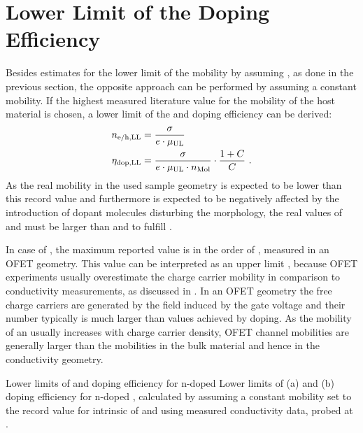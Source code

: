 \section{Lower Limit of the Doping Efficiency}\label{sec:rechDopEffLL}
Besides estimates for the lower limit of the mobility by assuming \DopEff[100], as done in the previous section, the opposite approach can be performed by assuming a constant mobility. If the highest measured literature value for the mobility \mobUL of the host material is chosen, a lower limit of the \nLong \nehLL and doping efficiency \DopEffLL can be derived:
\begin{align}
\nehLL &= \frac{\c}{e\cdot\mobUL} \label{eq:nehLL}\\
\DopEffLL &= \frac{\c}{e \cdot \mobUL \cdot \nM} \cdot \frac{1+\C}{\C} \label{eq:DopEffLL}
\PUNKT
\end{align}
As the real mobility in the used sample geometry is expected to be lower than this record value \mobUL and furthermore is expected to be negatively affected by the introduction of dopant molecules disturbing the morphology, the real values of \neh and \DopEff must be larger than \nehLL and \DopEffLL to fulfill .

In case of \CS, the maximum reported value is in the order of \mob[5]\cite{Itaka2006}, measured in an OFET geometry.
This value can be interpreted as an upper limit \mobUL, because OFET experiments usually overestimate the charge carrier mobility in comparison to conductivity measurements, as discussed in . In an OFET geometry the free charge carriers are generated by the field induced by the gate voltage and their number typically is much larger than values achieved by doping. As the mobility of an \OSC usually increases with charge carrier density, OFET channel mobilities are generally larger than the mobilities in the bulk material and hence in the conductivity geometry.

{Lower limits of \neLong and doping efficiency for n-doped \CS}
{Lower limits of (a) \neLong \neLL and (b) doping efficiency \DopEffLL for n-doped \CS, calculated by assuming a constant mobility set to the record value for intrinsic \CS of \mob[5]\cite{Itaka2006} and using measured conductivity data, probed at \T[40].}%

